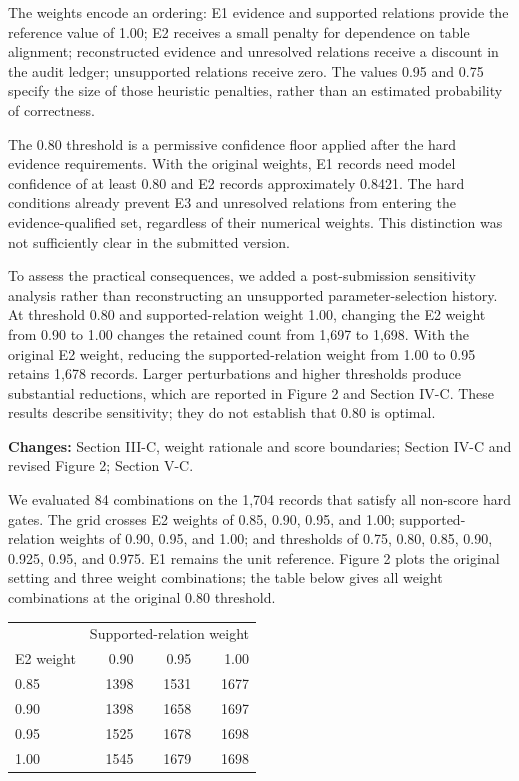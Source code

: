 The weights encode an ordering: E1 evidence and supported relations provide the reference value of 1.00; E2 receives a small penalty for dependence on table alignment; reconstructed evidence and unresolved relations receive a discount in the audit ledger; unsupported relations receive zero. The values 0.95 and 0.75 specify the size of those heuristic penalties, rather than an estimated probability of correctness.

The 0.80 threshold is a permissive confidence floor applied after the hard evidence requirements. With the original weights, E1 records need model confidence of at least 0.80 and E2 records approximately 0.8421. The hard conditions already prevent E3 and unresolved relations from entering the evidence-qualified set, regardless of their numerical weights. This distinction was not sufficiently clear in the submitted version.

To assess the practical consequences, we added a post-submission sensitivity analysis rather than reconstructing an unsupported parameter-selection history. At threshold 0.80 and supported-relation weight 1.00, changing the E2 weight from 0.90 to 1.00 changes the retained count from 1,697 to 1,698. With the original E2 weight, reducing the supported-relation weight from 1.00 to 0.95 retains 1,678 records. Larger perturbations and higher thresholds produce substantial reductions, which are reported in Figure 2 and Section IV-C. These results describe sensitivity; they do not establish that 0.80 is optimal.

\textbf{Changes:} Section III-C, weight rationale and score boundaries; Section IV-C and revised Figure 2; Section V-C.


We evaluated 84 combinations on the 1,704 records that satisfy all non-score hard gates. The grid crosses E2 weights of 0.85, 0.90, 0.95, and 1.00; supported-relation weights of 0.90, 0.95, and 1.00; and thresholds of 0.75, 0.80, 0.85, 0.90, 0.925, 0.95, and 0.975. E1 remains the unit reference. Figure 2 plots the original setting and three weight combinations; the table below gives all weight combinations at the original 0.80 threshold.

\begin{center}
\begin{tabular}{lrrr}
\toprule
& \multicolumn{3}{c}{Supported-relation weight} \\
E2 weight & 0.90 & 0.95 & 1.00 \\
\midrule
0.85 & 1398 & 1531 & 1677 \\
0.90 & 1398 & 1658 & 1697 \\
0.95 & 1525 & 1678 & 1698 \\
1.00 & 1545 & 1679 & 1698 \\
\bottomrule
\end{tabular}
\end{center}


